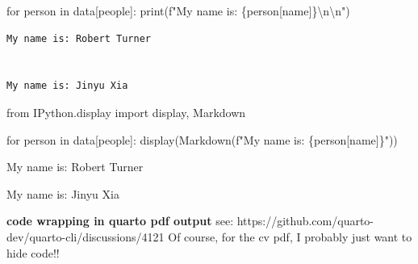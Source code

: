 \documentclass[
]
{article}
\newenvironment{Shaded}{\begin{snugshade}}{\end{snugshade}}
\newcommand{\BuiltInTok}[1]{\textcolor[rgb]{0.00,0.23,0.31}{#1}}
\newcommand{\CharTok}[1]{\textcolor[rgb]{0.13,0.47,0.30}{#1}}
\newcommand{\ControlFlowTok}[1]{\textcolor[rgb]{0.00,0.23,0.31}{#1}}
\newcommand{\ImportTok}[1]{\textcolor[rgb]{0.00,0.46,0.62}{#1}}
\newcommand{\KeywordTok}[1]{\textcolor[rgb]{0.00,0.23,0.31}{#1}}
\newcommand{\NormalTok}[1]{\textcolor[rgb]{0.00,0.23,0.31}{#1}}
\newcommand{\SpecialCharTok}[1]{\textcolor[rgb]{0.37,0.37,0.37}{#1}}
\newcommand{\SpecialStringTok}[1]{\textcolor[rgb]{0.13,0.47,0.30}{#1}}
\newcommand{\StringTok}[1]{\textcolor[rgb]{0.13,0.47,0.30}{#1}}
\begin{document}
\begin{Shaded}
\begin{Highlighting}[]
\ControlFlowTok{for}\NormalTok{ person }\KeywordTok{in}\NormalTok{ data[}\StringTok{\textquotesingle{}people\textquotesingle{}}\NormalTok{]:}
    \BuiltInTok{print}\NormalTok{(}\SpecialStringTok{f"My name is: }\SpecialCharTok{\{}\NormalTok{person[}\StringTok{\textquotesingle{}name\textquotesingle{}}\NormalTok{]}\SpecialCharTok{\}}\CharTok{\textbackslash{}n\textbackslash{}n}\SpecialStringTok{"}\NormalTok{)}
\end{Highlighting}
\end{Shaded}

\begin{verbatim}
My name is: Robert Turner


My name is: Jinyu Xia

\end{verbatim}

\begin{Shaded}
\begin{Highlighting}[]
\ImportTok{from}\NormalTok{ IPython.display }\ImportTok{import}\NormalTok{ display, Markdown}

\ControlFlowTok{for}\NormalTok{ person }\KeywordTok{in}\NormalTok{ data[}\StringTok{\textquotesingle{}people\textquotesingle{}}\NormalTok{]:}
\NormalTok{    display(Markdown(}\SpecialStringTok{f"My name is: }\SpecialCharTok{\{}\NormalTok{person[}\StringTok{\textquotesingle{}name\textquotesingle{}}\NormalTok{]}\SpecialCharTok{\}}\SpecialStringTok{"}\NormalTok{))}
\end{Highlighting}
\end{Shaded}

My name is: Robert Turner

My name is: Jinyu Xia

\textbf{code wrapping in quarto pdf output} see:
https://github.com/quarto-dev/quarto-cli/discussions/4121 Of course, for
the cv pdf, I probably just want to hide code!!
\end{document}
